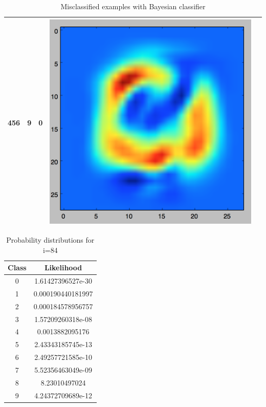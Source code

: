 \documentclass[11pt]{article}
\begin{document}
\begin{table}[!th]
\begin{tabular}{|clc|c||c|}
\hline
456 & 9 & 0 & \includegraphics[scale=.2]{images/bayes_9_0.png} \\
\hline
\end{tabular}
\caption{Misclassified examples with Bayesian classifier}
\label{ex:table}
\end{table}

\begin{table}[!th]
\centering
\begin{tabular}{|c|c|}
\hline
Class & Likelihood \\
\hline
0 & 1.61427396527e-30 \\
1 & 0.000190440181997 \\
2 & 0.000184578956757 \\
3 & 1.57209260318e-08 \\
4 & 0.0013882095176 \\
5 & 2.43343185745e-13 \\
6 & 2.49257721585e-10 \\
7 & 5.52356463049e-09 \\
8 & 8.23010497024 \\
9 & 4.24372709689e-12 \\
\hline
\end{tabular}
\caption{Probability distributions for i=84}
\label{ex:table}
\end{table}
\end{document}
